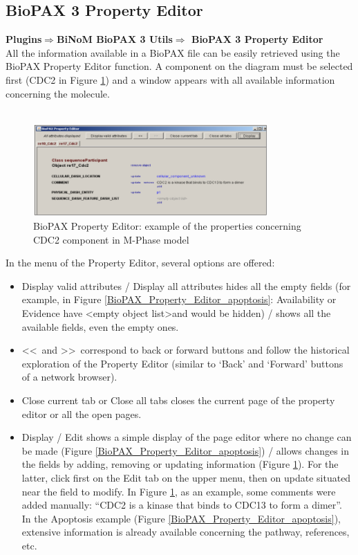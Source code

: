 \subsection{BioPAX 3 Property Editor} \label{BioPAX_Property_Editor}
\textbf{Plugins$\Rightarrow$BiNoM BioPAX 3 Utils$\Rightarrow$ BioPAX 3 Property Editor}\\
All the information available in a BioPAX file can be easily retrieved using the BioPAX Property Editor function. A component on the diagram must be selected first (CDC2 in Figure \ref{BioPAX_Property_Editor_cdc2}) and a window appears with all available information concerning the molecule.\\\\
\begin{figure}[h]
\centering
\includegraphics[width=0.8\textwidth]{graphics/BioPAX_Property_Editor_cdc2}
\caption{BioPAX Property Editor: example of the properties concerning CDC2 component in M-Phase model}
\label{BioPAX_Property_Editor_cdc2}
\end{figure}
\parbox{\textwidth}{ In the menu of the Property Editor, several options are offered:
\begin{itemize}
\item Display valid attributes / Display all attributes hides all the empty fields (for example, in Figure \ref{BioPAX_Property_Editor_apoptosis}: Availability or Evidence have \textless empty object list\textgreater and would be hidden) / shows all the available fields, even the empty ones.
\item  \textless\textless~and \textgreater\textgreater~correspond to back or forward buttons and follow the historical exploration of the Property Editor (similar to ‘Back’ and ‘Forward’ buttons of a network browser).
\item Close current tab or Close all tabs closes the current page of the property editor or all the open pages.
\item  Display / Edit shows a simple display of the page editor where no change can be made (Figure \ref{BioPAX_Property_Editor_apoptosis}) / allows changes in the fields by adding, removing or updating information (Figure \ref{BioPAX_Property_Editor_cdc2}). For the latter, click first on the Edit tab on the upper menu, then on update situated near the field to modify. In Figure \ref{BioPAX_Property_Editor_cdc2}, as an example, some comments were added manually: “CDC2 is a kinase that binds to CDC13 to form a dimer”. In the Apoptosis example (Figure \ref{BioPAX_Property_Editor_apoptosis}), extensive information is already available concerning the pathway, references, etc.
\end{itemize}}
